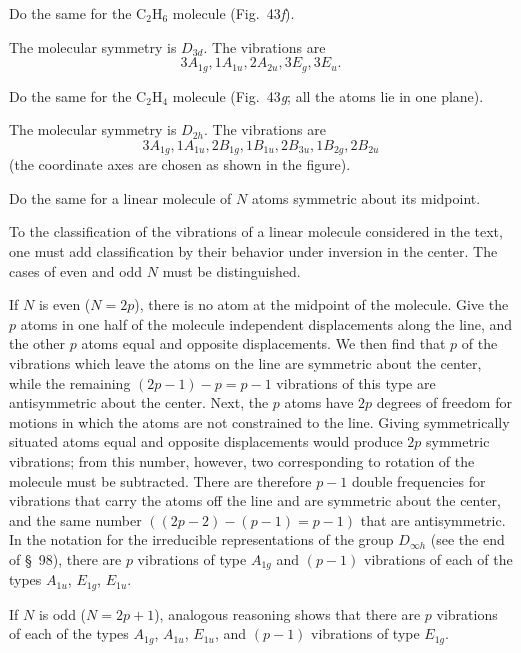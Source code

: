  Do the same for the $\mathrm{C_2H_6}$ molecule (Fig.~43\textit{f}).

\SolutionHeading The molecular symmetry is $D_{3d}$. The vibrations are
\[
3A_{1g},1A_{1u},2A_{2u},3E_g,3E_u.
\]

 Do the same for the $\mathrm{C_2H_4}$ molecule (Fig.~43\textit{g}; all the atoms lie in one plane).

\SolutionHeading The molecular symmetry is $D_{2h}$. The vibrations are
\[
3A_{1g},1A_{1u},2B_{1g},1B_{1u},2B_{3u},1B_{2g},2B_{2u}
\]
(the coordinate axes are chosen as shown in the figure).

 Do the same for a linear molecule of $N$ atoms symmetric about its midpoint.

\SolutionHeading To the classification of the vibrations of a linear molecule considered in the text, one must add classification by their behavior under inversion in the center. The cases of even and odd $N$ must be distinguished.

If $N$ is even ($N=2p$), there is no atom at the midpoint of the molecule. Give the $p$ atoms in one half of the molecule independent displacements along the line, and the other $p$ atoms equal and opposite displacements. We then find that $p$ of the vibrations which leave the atoms on the line are symmetric about the center, while the remaining $(2p-1)-p=p-1$ vibrations of this type are antisymmetric about the center. Next, the $p$ atoms have $2p$ degrees of freedom for motions in which the atoms are not constrained to the line. Giving symmetrically situated atoms equal and opposite displacements would produce $2p$ symmetric vibrations; from this number, however, two corresponding to rotation of the molecule must be subtracted. There are therefore $p-1$ double frequencies for vibrations that carry the atoms off the line and are symmetric about the center, and the same number $((2p-2)-(p-1)=p-1)$ that are antisymmetric. In the notation for the irreducible representations of the group $D_{\infty h}$ (see the end of \S~98), there are $p$ vibrations of type $A_{1g}$ and $(p-1)$ vibrations of each of the types $A_{1u}$, $E_{1g}$, $E_{1u}$.

If $N$ is odd ($N=2p+1$), analogous reasoning shows that there are $p$ vibrations of each of the types $A_{1g}$, $A_{1u}$, $E_{1u}$, and $(p-1)$ vibrations of type $E_{1g}$.
